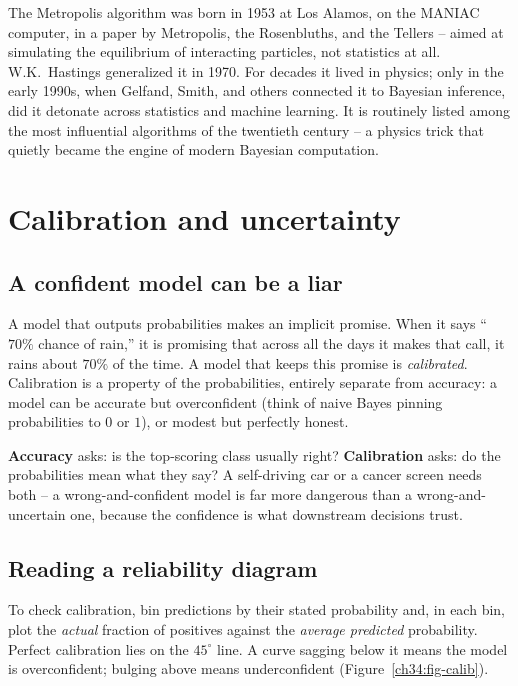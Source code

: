 \begin{historybox}
The Metropolis algorithm was born in 1953 at Los Alamos, on the MANIAC computer,
in a paper by Metropolis, the Rosenbluths, and the Tellers -- aimed at simulating
the equilibrium of interacting particles, not statistics at all. W.K.\ Hastings
generalized it in 1970. For decades it lived in physics; only in the early 1990s,
when Gelfand, Smith, and others connected it to Bayesian inference, did it
detonate across statistics and machine learning. It is routinely listed among the
most influential algorithms of the twentieth century -- a physics trick that
quietly became the engine of modern Bayesian computation.
\end{historybox}

\section{Calibration and uncertainty}
\label{ch34:calibration}

\subsection{A confident model can be a liar}

A model that outputs probabilities makes an implicit promise. When it says ``$70\%$
chance of rain,'' it is promising that across all the days it makes that call, it
rains about $70\%$ of the time. A model that keeps this promise is
\emph{calibrated}. Calibration is a property of the probabilities, entirely
separate from accuracy: a model can be accurate but overconfident (think of
naive Bayes pinning probabilities to $0$ or $1$), or modest but perfectly honest.

\begin{focusbox}
\textbf{Accuracy} asks: is the top-scoring class usually right? \textbf{Calibration}
asks: do the probabilities mean what they say? A self-driving car or a cancer
screen needs both -- a wrong-and-confident model is far more dangerous than a
wrong-and-uncertain one, because the confidence is what downstream decisions
trust.
\end{focusbox}

\subsection{Reading a reliability diagram}

To check calibration, bin predictions by their stated probability and, in each
bin, plot the \emph{actual} fraction of positives against the \emph{average
predicted} probability. Perfect calibration lies on the $45^\circ$ line. A curve
sagging below it means the model is overconfident; bulging above means
underconfident (Figure~\ref{ch34:fig-calib}).


